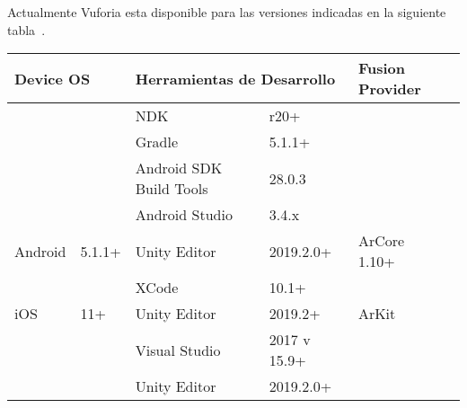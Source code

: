 Actualmente Vuforia esta disponible para las versiones indicadas en la siguiente tabla~\cite{vuforia_supported_versions}.
\begin{table}[]
	\begin{tabular}{|l|l|l|l|l|l|}
		\hline
		\multicolumn{2}{|l|}{Device OS}                       & \multicolumn{2}{l|}{Herramientas de Desarrollo}                                             & \multicolumn{2}{l|}{Fusion Provider}                \\ \hline
		&                          & NDK                                            & r20+                                       &                                &                    \\ \cline{3-4}
		&                          & \cellcolor[HTML]{EFEFEF}Gradle                 & \cellcolor[HTML]{EFEFEF}5.1.1+             &                                &                    \\ \cline{3-4}
		&                          & Android SDK Build Tools                        & 28.0.3                                     &                                &                    \\ \cline{3-4}
		&                          & \cellcolor[HTML]{EFEFEF}Android Studio         & \cellcolor[HTML]{EFEFEF}3.4.x              &                                &                    \\ \cline{3-4}
		\multirow{-5}{*}{Android}  & \multirow{-5}{*}{5.1.1+} & Unity Editor                                   & 2019.2.0+                                  & \multirow{-5}{*}{ArCore 1.10+} & \multirow{-5}{*}{} \\ \hline
		&                          & \cellcolor[HTML]{EFEFEF}XCode                  & \cellcolor[HTML]{EFEFEF}10.1+              & \multicolumn{2}{l|}{}                               \\ \cline{3-4}
		\multirow{-2}{*}{iOS}      & \multirow{-2}{*}{11+}    & Unity Editor                                   & 2019.2+                                    & \multicolumn{2}{l|}{\multirow{-2}{*}{ArKit}}        \\ \hline
		&                          & \cellcolor[HTML]{EFEFEF}Visual Studio          & \cellcolor[HTML]{EFEFEF}2017 v 15.9+ & \multicolumn{2}{l|}{}                               \\ \cline{3-4}
		&                          & Unity Editor                                   & 2019.2.0+                                  & \multicolumn{2}{l|}{}                               \\ \cline{3-4}

\end{tabular}
\end{table}
